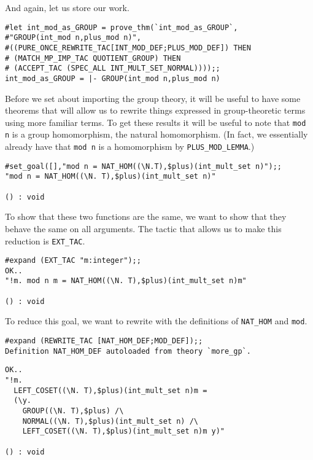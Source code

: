 And again, let us store our work.
\begin{session}
\begin{verbatim}
#let int_mod_as_GROUP = prove_thm(`int_mod_as_GROUP`,
#"GROUP(int_mod n,plus_mod n)",
#((PURE_ONCE_REWRITE_TAC[INT_MOD_DEF;PLUS_MOD_DEF]) THEN
# (MATCH_MP_IMP_TAC QUOTIENT_GROUP) THEN
# (ACCEPT_TAC (SPEC_ALL INT_MULT_SET_NORMAL))));;
int_mod_as_GROUP = |- GROUP(int_mod n,plus_mod n)
\end{verbatim}
\end{session}

Before we set about importing the group theory, it will be useful to
have some theorems that will allow us to rewrite things expressed in
group-theoretic terms using more familiar terms.  To get these results
it will be useful to note that {\small\verb+mod n+} is a group
homomorphism, the natural homomorphism.  (In fact, we essentially
already have that {\small\verb+mod n+} is a homomorphism by
{\small\verb+PLUS_MOD_LEMMA+}.) 
\begin{session}
\begin{verbatim}
#set_goal([],"mod n = NAT_HOM((\N.T),$plus)(int_mult_set n)");;
"mod n = NAT_HOM((\N. T),$plus)(int_mult_set n)"

() : void
\end{verbatim}
\end{session}

To show that these two functions are the same, we want to show that
they behave the same on all arguments.  The tactic that allows us to
make this reduction is {\small\verb+EXT_TAC+}.
\begin{session}
\begin{verbatim}
#expand (EXT_TAC "m:integer");;
OK..
"!m. mod n m = NAT_HOM((\N. T),$plus)(int_mult_set n)m"

() : void
\end{verbatim}
\end{session}

To reduce this goal, we want to rewrite with the definitions of
{\small\verb+NAT_HOM+} and {\small\verb+mod+}.
\begin{session}
\begin{verbatim}
#expand (REWRITE_TAC [NAT_HOM_DEF;MOD_DEF]);;
Definition NAT_HOM_DEF autoloaded from theory `more_gp`.
\end{verbatim}
\mvdots
\begin{verbatim}
OK..
"!m.
  LEFT_COSET((\N. T),$plus)(int_mult_set n)m =
  (\y.
    GROUP((\N. T),$plus) /\
    NORMAL((\N. T),$plus)(int_mult_set n) /\
    LEFT_COSET((\N. T),$plus)(int_mult_set n)m y)"

() : void
\end{verbatim}
\end{session}

